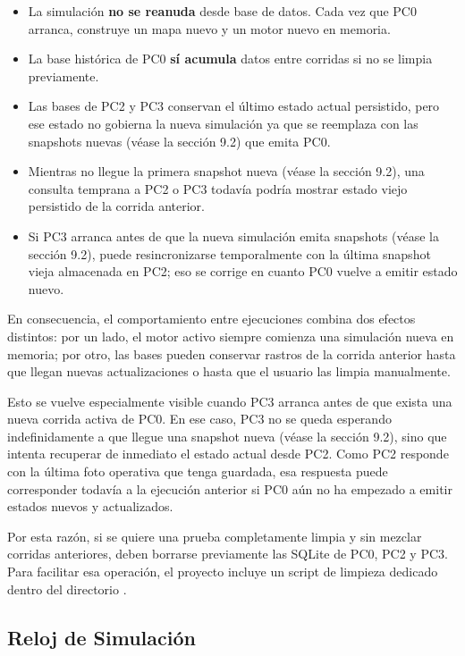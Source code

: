 \documentclass[12pt, a4paper]{article}
\let\oldtexttt\texttt
\renewcommand{\texttt}[1]{\oldtexttt{\seqsplit{#1}}}
\begin{document}
\begin{itemize}
    \item La simulación \textbf{no se reanuda} desde base de datos. Cada vez que PC0 arranca, construye un mapa nuevo y un motor nuevo en memoria.
    \item La base histórica de PC0 \textbf{sí acumula} datos entre corridas si no se limpia previamente.
    \item Las bases de PC2 y PC3 conservan el último estado actual persistido, pero ese estado no gobierna la nueva simulación ya que se reemplaza con las snapshots nuevas (véase la sección 9.2) que emita PC0.
    \item Mientras no llegue la primera snapshot nueva (véase la sección 9.2), una consulta temprana a PC2 o PC3 todavía podría mostrar estado viejo persistido de la corrida anterior.
    \item Si PC3 arranca antes de que la nueva simulación emita snapshots (véase la sección 9.2), puede resincronizarse temporalmente con la última snapshot vieja almacenada en PC2; eso se corrige en cuanto PC0 vuelve a emitir estado nuevo.
\end{itemize}

En consecuencia, el comportamiento entre ejecuciones combina dos efectos distintos: por un lado, el motor activo siempre comienza una simulación nueva en memoria; por otro, las bases pueden conservar rastros de la corrida anterior hasta que llegan nuevas actualizaciones o hasta que el usuario las limpia manualmente.

Esto se vuelve especialmente visible cuando PC3 arranca antes de que exista una nueva corrida activa de PC0. En ese caso, PC3 no se queda esperando indefinidamente a que llegue una snapshot nueva (véase la sección 9.2), sino que intenta recuperar de inmediato el estado actual desde PC2. Como PC2 responde con la última foto operativa que tenga guardada, esa respuesta puede corresponder todavía a la ejecución anterior si PC0 aún no ha empezado a emitir estados nuevos y actualizados.

Por esta razón, si se quiere una prueba completamente limpia y sin mezclar corridas anteriores, deben borrarse previamente las SQLite de PC0, PC2 y PC3. Para facilitar esa operación, el proyecto incluye un script de limpieza dedicado dentro del directorio \texttt{scripts}.

\subsection{Reloj de Simulación}
\end{document}
